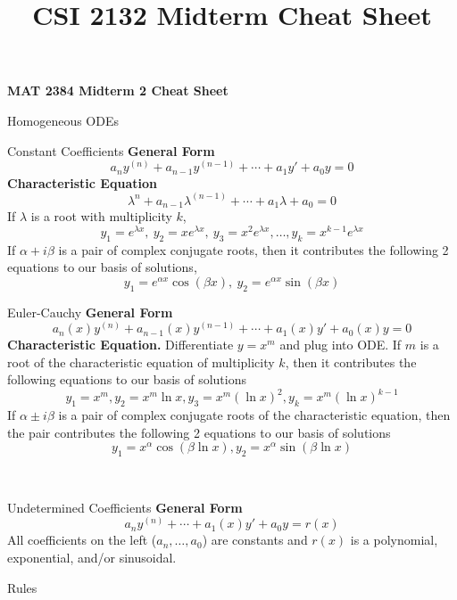 \documentclass{article}
\title{CSI 2132 Midterm Cheat Sheet}
\begin{document}
\begin{center}{\large{\textbf{MAT 2384 Midterm 2 Cheat Sheet}}}\\
\end{center}




\begin{multicols*}{3}
\begin{blackbox}{Homogeneous ODEs}
    {\footnotesize
    \begin{bluebox}{Constant Coefficients}
        \textbf{General Form}\\[-2ex]
        \[a_ny^{(n)} + a_{n-1}y^{(n-1)} + \cdots + a_1y' + a_0y = 0\]
        \textbf{Characteristic Equation}
        \[\lambda^n + a_{n-1}\lambda^{(n-1)} + \cdots + a_1\lambda + a_0 = 0\]
        If $\lambda$ is a root with multiplicity $k$, 
        \[y_1 = e^{\lambda x}, \ y_2 = xe^{\lambda x}, \ y_3 = x^2e^{\lambda x}, \ldots, y_k = x^{k-1}e^{\lambda x}\]
        If $\alpha + i\beta$ is a pair of complex conjugate roots, then it contributes the following 2 equations to our basis of solutions,\\[-2ex]
        \[y_1 = e^{\alpha x}\cos(\beta x), \ y_2 = e^{\alpha x}\sin(\beta x)\]
    \end{bluebox}
    \begin{brownbox}{Euler-Cauchy}
        \textbf{General Form}\\[-2ex]
        \[a_n(x)y^{(n)} + a_{n-1}(x)y^{(n-1)} + \cdots + a_1(x)y' + a_0(x)y = 0\]
        \textbf{Characteristic Equation.} Differentiate $y = x^m$ and plug into ODE. If $m$ is a root of the characteristic equation of multiplicity $k$, then it contributes the following equations to our basis of solutions
        \[y_1 = x^m, y_2 = x^m\ln x, y_3 = x^m (\ln x)^2, y_k = x^m(\ln x)^{k-1}\]
        If $\alpha \pm i\beta$ is a pair of complex conjugate roots of the characteristic equation, then the pair contributes the following 2 equations to our basis of solutions
        \[y_1 = x^{\alpha} \cos(\beta \ln x), y_2 = x^\alpha\sin(\beta \ln x)\]
    \end{brownbox}\\[-2ex]
    }
\end{blackbox}
\begin{blackbox}{Undetermined Coefficients}
    \textbf{General Form}\\[-2ex]
    \[a_ny^{(n)} + \cdots + a_1(x)y' + a_0y = r(x)\]
    All coefficients on the left ($a_n, \ldots, a_0$) are constants and $r(x)$ is a polynomial, exponential, and/or sinusoidal.
    \begin{pinkbox}{Rules}

\end{pinkbox}
\end{blackbox}
\end{multicols*}
\end{document}
